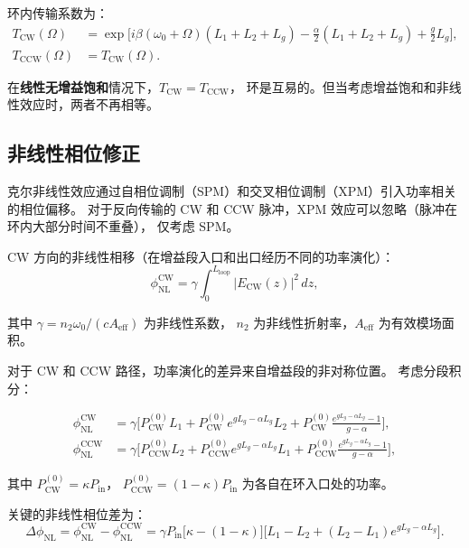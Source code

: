 \documentclass[11pt,a4paper]{ctexart}
\begin{document}
环内传输系数为：
\begin{align}
  T_{\text{CW}}(\Omega) &= \exp\!\Big[i\beta(\omega_0+\Omega)(L_1+L_2+L_g)
                          - \frac{\alpha}{2}(L_1+L_2+L_g)
                          + \frac{g}{2}L_g\Big], \label{eq:TCW} \\[4pt]
  T_{\text{CCW}}(\Omega) &= T_{\text{CW}}(\Omega).
  \label{eq:TCCW}
\end{align}

在\textbf{线性无增益饱和}情况下，$T_{\text{CW}} = T_{\text{CCW}}$，
环是互易的。但当考虑增益饱和和非线性效应时，两者不再相等。

\subsection{非线性相位修正}

克尔非线性效应通过自相位调制（SPM）和交叉相位调制（XPM）引入功率相关的相位偏移。
对于反向传输的 CW 和 CCW 脉冲，XPM 效应可以忽略（脉冲在环内大部分时间不重叠），
仅考虑 SPM。

CW 方向的非线性相移（在增益段入口和出口经历不同的功率演化）：
\begin{equation}
  \phi_{\text{NL}}^{\text{CW}} = \gamma \int_{0}^{L_{\text{loop}}}
  |E_{\text{CW}}(z)|^2 \, dz,
  \label{eq:phi_NL_CW}
\end{equation}

其中 $\gamma = n_2 \omega_0 / (c A_{\text{eff}})$ 为非线性系数，
$n_2$ 为非线性折射率，$A_{\text{eff}}$ 为有效模场面积。

对于 CW 和 CCW 路径，功率演化的差异来自增益段的非对称位置。
考虑分段积分：

\begin{align}
  \phi_{\text{NL}}^{\text{CW}} &= \gamma \Big[
    P_{\text{CW}}^{(0)} L_1
    + P_{\text{CW}}^{(0)} e^{gL_g - \alpha L_g} L_2
    + P_{\text{CW}}^{(0)} \frac{e^{gL_g - \alpha L_g} - 1}{g - \alpha}
  \Big], \\[4pt]
  \phi_{\text{NL}}^{\text{CCW}} &= \gamma \Big[
    P_{\text{CCW}}^{(0)} L_2
    + P_{\text{CCW}}^{(0)} e^{gL_g - \alpha L_g} L_1
    + P_{\text{CCW}}^{(0)} \frac{e^{gL_g - \alpha L_g} - 1}{g - \alpha}
  \Big],
\end{align}

其中 $P_{\text{CW}}^{(0)} = \kappa P_{\text{in}}$，
$P_{\text{CCW}}^{(0)} = (1-\kappa) P_{\text{in}}$ 为各自在环入口处的功率。

关键的非线性相位差为：
\begin{equation}
  \Delta\phi_{\text{NL}} = \phi_{\text{NL}}^{\text{CW}} - \phi_{\text{NL}}^{\text{CCW}}
  = \gamma P_{\text{in}} \Big[\kappa - (1-\kappa)\Big]
    \Big[ L_1 - L_2 + (L_2 - L_1) e^{gL_g - \alpha L_g} \Big].
  \label{eq:delta_phi_NL}
\end{equation}
\end{document}
